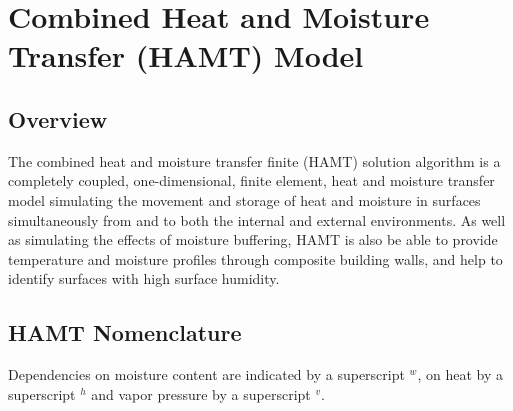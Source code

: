 \section{Combined Heat and Moisture Transfer (HAMT) Model}\label{combined-heat-and-moisture-transfer-hamt-model}

\subsection{Overview}\label{overview-011}

The combined heat and moisture transfer finite (HAMT) solution algorithm is
a completely coupled, one-dimensional, finite element, heat and moisture
transfer model simulating the movement and storage of heat and moisture in
surfaces simultaneously from and to both the internal and external
environments. As well as simulating the effects of moisture buffering, HAMT
is also be able to provide temperature and moisture profiles through
composite building walls, and help to identify surfaces with high surface
humidity.

\subsection{HAMT Nomenclature}\label{hamt-nomenclature}

Dependencies on moisture content are indicated by a superscript \(^w\),
on heat by a superscript \(^h\) and vapor pressure by a superscript
\(^v\).

